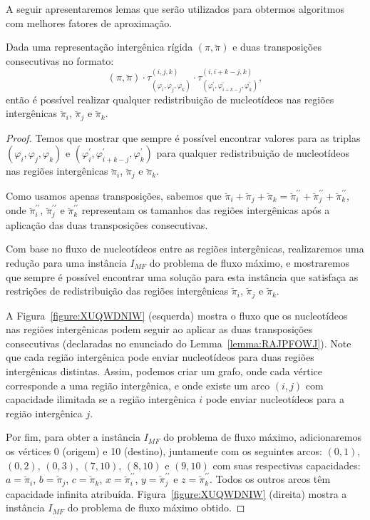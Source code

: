 A seguir apresentaremos lemas que serão utilizados para obtermos algoritmos com melhores fatores de aproximação.

\begin{lemma}\label{lemma:RAJPFOWJ}
Dada uma representação intergênica rígida $(\pi,\breve\pi)$ e duas transposições consecutivas no formato:
$$(\pi,\breve\pi)\cdot\tau^{(i,j,k)}_{(\varphi_i,\varphi_j,\varphi_k)}\cdot\tau^{(i,i+k-j,k)}_{(\varphi^\prime_i,\varphi^\prime_{i+k-j},\varphi^\prime_k)},$$
então é possível realizar qualquer redistribuição de nucleotídeos nas regiões intergênicas $\breve\pi_i$, $\breve\pi_j$ e $\breve\pi_k$.
\end{lemma} 
\begin{proof}
Temos que mostrar que sempre é possível encontrar valores para as triplas $(\varphi_i,\varphi_j,\varphi_k)$ e $(\varphi^\prime_i,\varphi^\prime_{i+k-j},\varphi^\prime_k)$ para qualquer redistribuição de nucleotídeos nas regiões intergênicas $\breve\pi_i$, $\breve\pi_j$ e $\breve\pi_k$.

Como usamos apenas transposições, sabemos que $\breve\pi_i + \breve\pi_j + \breve\pi_k = \breve\pi^{\prime\prime}_i + \breve\pi^{\prime\prime}_j + \breve\pi^{\prime\prime}_k$, onde $\breve\pi^{\prime\prime}_i$, $\breve\pi^{\prime\prime}_j$ e $\breve \pi^{\prime\prime}_k$ representam os tamanhos das regiões intergênicas após a aplicação das duas transposições consecutivas.

Com base no fluxo de nucleotídeos entre as regiões intergênicas, realizaremos uma redução para uma instância $I_{MF}$ do problema de fluxo máximo, e mostraremos que sempre é possível encontrar uma solução para esta instância que satisfaça as restrições de redistribuição das regiões intergênicas $\breve\pi_i$, $\breve\pi_j$ e $\breve\pi_k$.

A Figura~\ref{figure:XUQWDNIW} (esquerda) mostra o fluxo que os nucleotídeos nas regiões intergênicas podem seguir ao aplicar as duas transposições consecutivas (declaradas no enunciado do Lemma~\ref{lemma:RAJPFOWJ}). Note que cada região intergênica pode enviar nucleotídeos para duas regiões intergênicas distintas. Assim, podemos criar um grafo, onde cada vértice corresponde a uma região intergênica, e onde existe um arco $(i,j)$ com capacidade ilimitada se a região intergênica $i$ pode enviar nucleotídeos para a região intergênica $j$.

Por fim, para obter a instância $I_{MF}$ do problema de fluxo máximo, adicionaremos os vértices 0 (origem) e 10 (destino), juntamente com os seguintes arcos: $(0,1)$, $(0, 2)$, $(0,3)$, $(7,10)$, $(8,10)$ e $(9,10)$ com suas respectivas capacidades: $a=\breve\pi_i$, $b=\breve\pi_j$, $c=\breve\pi_k$, $x=\breve\pi^{\prime\prime}_i$, $y=\breve\pi^{\prime\prime}_j $ e $z=\breve\pi^{\prime\prime}_k$. Todos os outros arcos têm capacidade infinita atribuída. Figura~\ref{figure:XUQWDNIW} (direita) mostra a instância $I_{MF}$ do problema de fluxo máximo obtido.


\end{proof}

